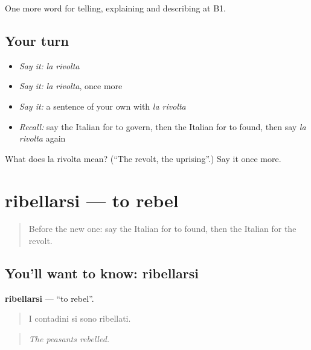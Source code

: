 \begin{grammarlens}[title={What you've built}]
One more word for telling, explaining and describing at B1.
\end{grammarlens}

\subsection*{Your turn}
\begin{itemize}
\raggedright
  \item \emph{Say it:} \emph{la rivolta}
  \item \emph{Say it:} \emph{la rivolta}, once more
  \item \emph{Say it:} a sentence of your own with \emph{la rivolta}
  \item \emph{Recall:} say the Italian for to govern, then the Italian for to found, then say \emph{la rivolta} again
\end{itemize}

\begin{tcolorbox}[breakable,colback=teal!4,colframe=teal!35!black,title={Before you move on}]
What does la rivolta mean? (\textquotedblleft{}The revolt, the uprising\textquotedblright{}.) Say it once more.
\end{tcolorbox}
\section[ribellarsi]{ribellarsi — to rebel}

\label{lesson:IT-C329-ribellarsi}



\begin{quote}
Before the new one: say the Italian for to found, then the Italian for the revolt.
\end{quote}

\subsection*{You'll want to know: ribellarsi}
\textbf{ribellarsi} — \textquotedblleft{}to rebel\textquotedblright{}.

\begin{quote}
I contadini si sono ribellati.
\end{quote}

\begin{quote}
\emph{The peasants rebelled.}
\end{quote}

